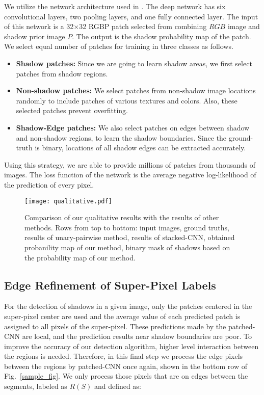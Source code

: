\documentclass[letterpaper, 10 pt, conference]{ieeeconf}
\begin{document}
We utilize the network architecture used in \cite{Vicente2}. The deep network has six convolutional layers, two pooling layers, and one fully connected layer. The input of this network is a 32$\times$32 RGBP patch selected from combining $RGB$ image and shadow prior image $P$. The output is the shadow probability map of the patch.
We select equal number of patches for training in three classes as follows.

\begin{itemize}
\item {\textbf{Shadow patches:}} Since we are going to learn shadow areas, we first select patches from shadow regions. 

\item {\textbf{Non-shadow patches:}} We select patches from non-shadow image locations randomly to include patches of various textures and colors. Also, these selected patches prevent overfitting. 

\item {\textbf{Shadow-Edge patches:}} We also select patches on edges between shadow and non-shadow regions, to learn the shadow boundaries. Since the ground-truth is binary, locations of all shadow edges can be extracted accurately.
\end{itemize}

Using this strategy, we are able to provide millions of patches from thousands of images. The loss function of the network is the average negative log-likelihood of the prediction of every pixel.

\begin{figure*}[b!]
    \centering
    \texttt{[image: qualitative.pdf]}
    \caption{Comparison of our qualitative results with the results of other methods. Rows from top to bottom: input images, ground truths, results of unary-pairwise method, results of stacked-CNN, obtained probanility map of our method, binary mask of shadows based on the probability map of our method.}
    \label{fig:qual_res}
\end{figure*}

\subsection{Edge Refinement of Super-Pixel Labels}
\label{detection}
For the detection of shadows in a given image, only the patches centered in the super-pixel center are used and the average value of each predicted patch is assigned to all pixels of the super-pixel. These predictions made by the patched-CNN are local, and the prediction results near shadow boundaries are poor. To improve the accuracy of our detection algorithm, higher level interaction between the regions is needed. Therefore, in this final step we process the edge pixels between the regions by patched-CNN once again, shown in the bottom row of Fig.~\ref{sample_fig}. We only process those pixels that are on edges between the segments, labeled as $R(S)$ and defined as:
\end{document}
